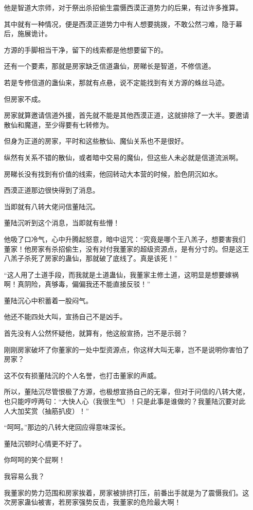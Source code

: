 \begin{this_body}
他是智道大宗师，对于祭出杀招偷生震慑西漠正道势力的后果，有过许多推算。

其中就有一种情况，便是西漠正道势力中有人想要挑拨，不敢公然刁难，隐于幕后，施展诡计。

方源的手脚相当干净，留下的线索都是他想要留下的。

还有一个要素，那就是房家缺乏信道蛊仙，房睇长是智道，不修信道。

若是专修信道的蛊仙来，那就有点悬，说不定能找到有关方源的蛛丝马迹。

但房家不成。

房家就算邀请信道外援，首先就不能是其他西漠正道，这就排除了一大半。要邀请散仙和魔道，至少得要有七转修为。

但身为正道的房家，平时和这些散仙、魔仙关系也不是很好。

纵然有关系不错的散仙，或者暗中交易的魔仙，但这些人未必就是信道流派啊。

房睇长没有找到有价值的线索，他回转动大本营的时候，脸色阴沉如水。

西漠正道那边很快得到了消息。

当即就有八转大佬问信董陆沉。

董陆沉听到这个消息，当即就有些懵！

他吸了口冷气，心中升腾起怒意，暗中诅咒：“究竟是哪个王八羔子，想要害我们董家！他房家有杀招偷生，没有对付我董家的超级资源点，是有分寸的。但是这王八羔子杀死了房家的蛊仙，那就破了底线了。真是该死！”

“这人用了土道手段，而我就是土道蛊仙，我董家主修土道，这明显是想要嫁祸啊！真阴险，真够毒，偏偏我还不能直接反驳！”

董陆沉心中积蓄着一股闷气。

他还不能四处大叫，宣扬自己不是凶手。

首先没有人公然怀疑他，就算有，他这般宣扬，岂不是示弱？

刚刚房家破坏了你董家的一处中型资源点，你这样大叫无辜，岂不是说明你害怕了房家？

这不仅有损董陆沉的个人名誉，也打击董家的声威。

所以，董陆沉尽管恨极了方源，也极想宣扬自己的无辜，但对于问信的八转大佬，也只能哼哼两句：“大快人心（我很生气）！只是此事是谁做的？我董陆沉要对此人大加奖赏（抽筋扒皮）！”

“呵呵。”那边的八转大佬回应得意味深长。

董陆沉顿时心情更不好了。

你呵呵的笑个屁啊！

我容易么我？

我董家的势力范围和房家挨着，房家被排挤打压，前番出手就是为了震慑我们。这次房家蛊仙被害，若房家强势反击，我董家的危险最大啊！

\end{this_body}


